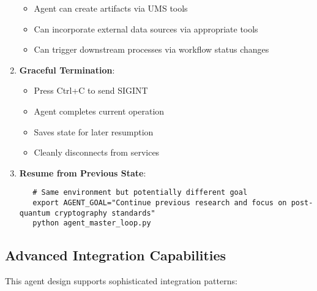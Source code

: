 \documentclass[12pt,a4paper]{article}
\begin{document}
\begin{enumerate}[label=\arabic*.]
\begin{itemize}
        \item Agent can create artifacts via UMS tools
        \item Can incorporate external data sources via appropriate tools
        \item Can trigger downstream processes via workflow status changes
    \end{itemize}
    \item \textbf{Graceful Termination}:
    \begin{itemize}
        \item Press Ctrl+C to send SIGINT
        \item Agent completes current operation
        \item Saves state for later resumption
        \item Cleanly disconnects from services
    \end{itemize}
    \item \textbf{Resume from Previous State}:
    \begin{pageablecode}
    \begin{verbatim}
   # Same environment but potentially different goal
   export AGENT_GOAL="Continue previous research and focus on post-quantum cryptography standards"
   python agent_master_loop.py
    \end{verbatim}
    \end{pageablecode}
\end{enumerate}

\subsection*{Advanced Integration Capabilities}

This agent design supports sophisticated integration patterns:
\end{document}
